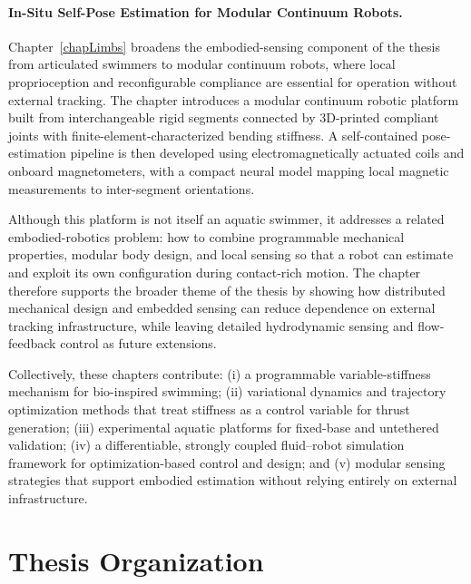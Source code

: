 \paragraph{In-Situ Self-Pose Estimation for Modular Continuum Robots.}
Chapter~\ref{chapLimbs} broadens the embodied-sensing component of the thesis from articulated swimmers to modular continuum robots, where local proprioception and reconfigurable compliance are essential for operation without external tracking. The chapter introduces a modular continuum robotic platform built from interchangeable rigid segments connected by 3D-printed compliant joints with finite-element-characterized bending stiffness. A self-contained pose-estimation pipeline is then developed using electromagnetically actuated coils and onboard magnetometers, with a compact neural model mapping local magnetic measurements to inter-segment orientations.

Although this platform is not itself an aquatic swimmer, it addresses a related embodied-robotics problem: how to combine programmable mechanical properties, modular body design, and local sensing so that a robot can estimate and exploit its own configuration during contact-rich motion. The chapter therefore supports the broader theme of the thesis by showing how distributed mechanical design and embedded sensing can reduce dependence on external tracking infrastructure, while leaving detailed hydrodynamic sensing and flow-feedback control as future extensions.

Collectively, these chapters contribute: (i) a programmable variable-stiffness mechanism for bio-inspired swimming; (ii) variational dynamics and trajectory optimization methods that treat stiffness as a control variable for thrust generation; (iii) experimental aquatic platforms for fixed-base and untethered validation; (iv) a differentiable, strongly coupled fluid--robot simulation framework for optimization-based control and design; and (v) modular sensing strategies that support embodied estimation without relying entirely on external infrastructure.

\section{Thesis Organization}
\label{sec:intro_organization}

